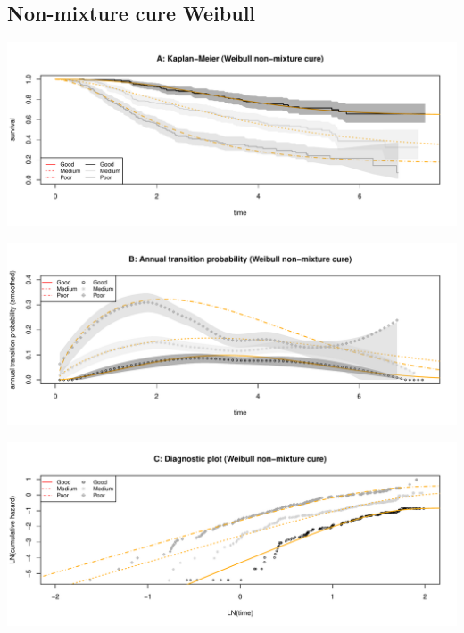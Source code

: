 \documentclass[]{article}
\begin{document}
\newpage

\subsection{Non-mixture cure Weibull}\label{non-mixture-cure-weibull}

\begin{flushleft}\includegraphics[height=0.25\textheight]{Images/cure_weib_nmix-1} \end{flushleft}

\begin{flushleft}\includegraphics[height=0.25\textheight]{Images/cure_weib_nmix-2} \end{flushleft}

\begin{flushleft}\includegraphics[height=0.25\textheight]{Images/cure_weib_nmix-3} \end{flushleft}
\end{document}
